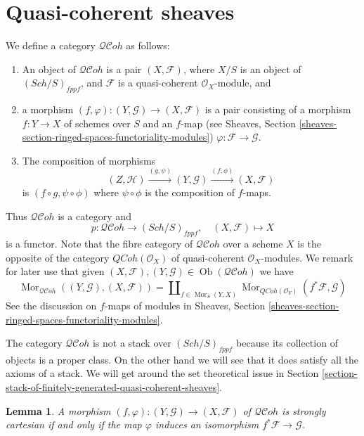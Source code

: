 \documentclass{stacks-project}
\theoremstyle{plain}
\newtheorem{lemma}[subsection]{Lemma}
\theoremstyle{definition}
\theoremstyle{remark}
\numberwithin{equation}{subsection}
\def\Sch{\mathit{Sch}}
\def\Mor{\mathop{\mathrm{Mor}}\nolimits}
\def\Ob{\mathop{\mathrm{Ob}}\nolimits}
\def\QCoh{\mathit{QCoh}}
\def\QCohstack{\mathcal{QC}\!\mathit{oh}}
\begin{document}
\section{Quasi-coherent sheaves}
\label{section-stack-of-quasi-coherent-sheaves}

\noindent
We define a category $\QCohstack$ as follows:
\begin{enumerate}
\item An object of $\QCohstack$ is a pair $(X, \mathcal{F})$,
where $X/S$ is an object of $(\Sch/S)_{fppf}$, and $\mathcal{F}$
is a quasi-coherent $\mathcal{O}_X$-module, and
\item a morphism $(f, \varphi) : (Y, \mathcal{G}) \to (X, \mathcal{F})$
is a pair consisting of a morphism $f : Y \to X$ of schemes over $S$
and an $f$-map (see
Sheaves, Section \ref{sheaves-section-ringed-spaces-functoriality-modules})
$\varphi : \mathcal{F} \to \mathcal{G}$.
\item The composition of morphisms
$$
(Z, \mathcal{H}) \xrightarrow{(g, \psi)}
(Y, \mathcal{G}) \xrightarrow{(f, \phi)} (X, \mathcal{F})
$$
is $(f \circ g, \psi \circ \phi)$ where $\psi \circ \phi$ is
the composition of $f$-maps.
\end{enumerate}
Thus $\QCohstack$ is a category and
$$
p : \QCohstack \to (\Sch/S)_{fppf},
\quad
(X, \mathcal{F}) \mapsto X
$$
is a functor. Note that the fibre category of $\QCohstack$ over
a scheme $X$ is the opposite of the category $\QCoh(\mathcal{O}_X)$
of quasi-coherent $\mathcal{O}_X$-modules.
We remark for later use that given
$(X, \mathcal{F}), (Y, \mathcal{G}) \in \Ob(\QCohstack)$
we have
\begin{equation}
\label{equation-morphisms-qcoh}
\Mor_{\QCohstack}((Y, \mathcal{G}), (X, \mathcal{F}))
=
\coprod\nolimits_{f \in \Mor_S(Y, X)}
\Mor_{\QCoh(\mathcal{O}_Y)}(f^*\mathcal{F}, \mathcal{G})
\end{equation}
See the discussion on $f$-maps of modules in
Sheaves, Section \ref{sheaves-section-ringed-spaces-functoriality-modules}.

\medskip\noindent
The category $\QCohstack$ is not a stack over $(\Sch/S)_{fppf}$
because its collection of objects is a proper class. On the other hand
we will see that it does satisfy all the axioms of a stack. We will
get around the set theoretical issue in
Section \ref{section-stack-of-finitely-generated-quasi-coherent-sheaves}.

\begin{lemma}
\label{lemma-quasi-coherent-strongly-cartesian}
A morphism $(f, \varphi) : (Y, \mathcal{G}) \to (X, \mathcal{F})$
of $\QCohstack$ is strongly cartesian if and only if the
map $\varphi$ induces an isomorphism $f^*\mathcal{F} \to \mathcal{G}$.
\end{lemma}
\end{document}
